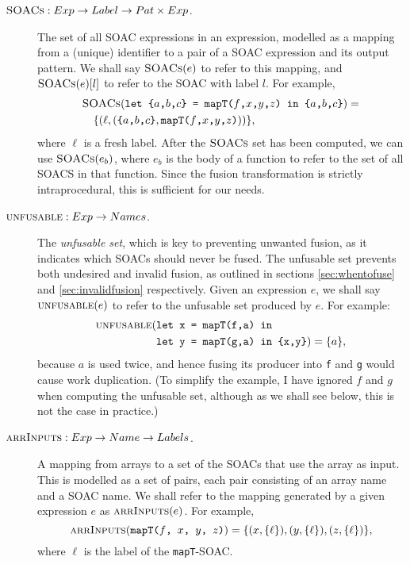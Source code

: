 \begin{description}
\item[$\textsc{SOACs} : Exp \rightarrow Label \rightarrow Pat \times Exp$.] The set
  of all SOAC expressions in an expression, modelled as a mapping from
  a (unique) identifier to a pair of a SOAC expression and its output
  pattern.  We shall say $\textsc{SOACs}(e)$ to refer to this mapping, and
  $\textsc{SOACs}(e)[l]$ to refer to the SOAC with label $l$.  For example,
  \begin{align*}
  & \textsc{SOACs}(\texttt{let \{$a$,$b$,$c$\} = mapT($f$,$x$,$y$,$z$) in \{$a$,$b$,$c$\}}) =\\
  & \quad \{ (\ell, (\texttt{\{$a$,$b$,$c$\}},\texttt{mapT($f$,$x$,$y$,$z$)})) \},
  \end{align*}
  where $\ell$ is a fresh label.  After the $\textsc{SOACs}$ set has been
  computed, we can use $\textsc{SOACs}(e_{b})$, where $e_{b}$ is the body of a
  function to refer to the set of all SOACS in that function.  Since
  the fusion transformation is strictly intraprocedural, this is
  sufficient for our needs.

\item[$\textsc{unfusable} : Exp \rightarrow Names$.] The \textit{unfusable set}, which
  is key to preventing unwanted fusion, as it indicates which SOACs
  should never be fused.  The unfusable set prevents both undesired
  and invalid fusion, as outlined in sections \ref{sec:whentofuse} and
  \ref{sec:invalidfusion} respectively.  Given an \LO{} expression
  $e$, we shall say $\textsc{unfusable}(e)$ to refer to the unfusable set
  produced by $e$.  For example:
  \begin{align*}
  \textsc{unfusable}(&\texttt{let x = mapT(f,a) in}\\
  &\texttt{let y = mapT(g,a) in \{x,y\}}) = \{a\},
  \end{align*}
  because $a$ is used twice, and hence fusing its producer into
  \texttt{f} and \texttt{g} would cause work duplication.  (To
  simplify the example, I have ignored $f$ and $g$ when computing the
  unfusable set, although as we shall see below, this is not the case
  in practice.)

\item[$\textsc{arrInputs} : Exp \rightarrow Name \rightarrow Labels$.] A mapping from arrays to a set of the SOACs that use the array
  as input.  This is modelled as a set of pairs, each pair consisting
  of an array name and a SOAC name.  We shall refer to the mapping
  generated by a given expression $e$ as $\textsc{arrInputs}(e)$.  For example,
  \[
  \textsc{arrInputs}(\texttt{mapT($f$, $x$, $y$, $z$)}) = \{ (x, \{\ell\}), (y, \{\ell\}), (z, \{\ell\}) \},
  \]
  where $\ell$ is the label of the \texttt{mapT}-SOAC.


\end{description}
